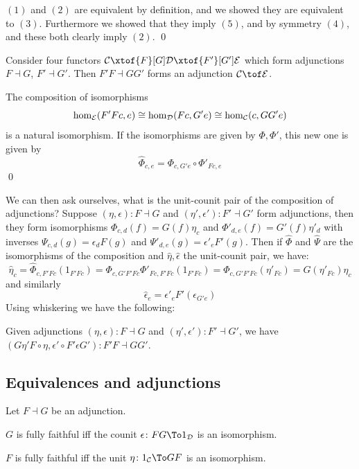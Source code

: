 \elemm

\bproof

    $(1)$ and $(2)$ are equivalent by definition, and we showed they are equivalent to $(3)$.
    Furthermore we showed that they imply $(5)$, and by symmetry $(4)$, and these both clearly imply $(2)$.
    \qed

\eproof

\bprop

    Consider four functors $\C\xtof{F}[G]\D\xtof{F'}[G']\E$ which form adjunctions $F\dashv G$, $F'\dashv G'$.
    Then $F'F\dashv GG'$ forms an adjunction $\C\tof\E$.

\eprop

\bproof

    The composition of isomorphisms
    $$ \hom_{{\cal E}}(F'Fc,e) \cong \hom_{{\cal D}}(Fc,G'e) \cong \hom_{{\cal C}}(c,GG'e) $$
    is a natural isomorphism.
    If the isomorphisms are given by $\Phi,\Phi'$, this new one is given by
    $$ \hat\Phi_{c,e} = \Phi_{c,G'e}\circ\Phi'_{Fc,e} $$
    \qed

\eproof

We can then ask ourselves, what is the unit-counit pair of the composition of adjunctions?
Suppose $(\eta,\epsilon)\colon F\dashv G$ and $(\eta',\epsilon')\colon F'\dashv G'$ form adjunctions, then they form isomorphisms $\Phi_{c,d}(f)=G(f)\eta_c$ and $\Phi'_{d,e}(f)=G'(f)\eta'_d$ with inverses
$\Psi_{c,d}(g)=\epsilon_dF(g)$ and $\Psi'_{d,e}(g)=\epsilon'_eF'(g)$.
Then if $\hat\Phi$ and $\hat\Psi$ are the isomorphisms of the composition and $\hat\eta,\hat\epsilon$ the unit-counit pair, we have:
$$ \hat\eta_c = \hat\Phi_{c,F'Fc}(1_{F'Fc}) = \Phi_{c,G'F'Fc}\Phi'_{Fc,F'Fc}(1_{F'Fc}) = \Phi_{c,G'F'Fc}(\eta'_{Fc}) = G(\eta'_{Fc})\eta_c $$
and similarly
$$ \hat\epsilon_e = \epsilon'_eF'(\epsilon_{G'e}) $$
Using whiskering we have the following:

\bprop

    Given adjunctions $(\eta,\epsilon)\colon F\dashv G$ and $(\eta',\epsilon')\colon F'\dashv G'$, we have $(G\eta'F\circ\eta,\epsilon'\circ F'\epsilon G')\colon F'F\dashv GG'$.

\eprop

\subsection{Equivalences and adjunctions}

\bprop

    Let $F\dashv G$ be an adjunction.
    \benum
        \item $G$ is fully faithful iff the counit $\epsilon\colon FG\To1_\D$ is an isomorphism.
        \item $F$ is fully faithful iff the unit $\eta\colon1_\C\To GF$ is an isomorphism.
    \eenum

